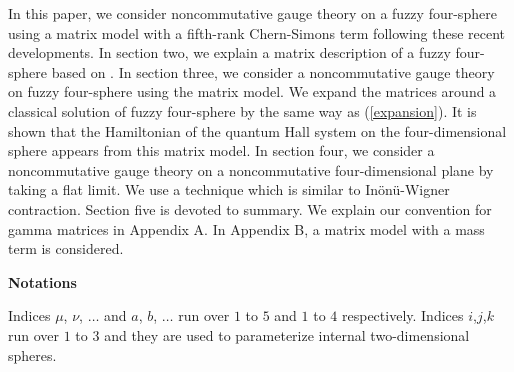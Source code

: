 \documentclass[a4paper,11pt]{article}
\begin{document}
In this paper, we consider noncommutative gauge theory on 
a fuzzy four-sphere using a matrix model 
with a fifth-rank Chern-Simons term 
following these recent developments. 
In section two, we explain a matrix description of 
a fuzzy four-sphere based on \cite{castelino}. 
In section three, we consider a noncommutative 
gauge theory on fuzzy four-sphere using the matrix model. 
We expand the matrices around a classical solution of fuzzy four-sphere 
by the same way as (\ref{expansion}). 
It is shown that the Hamiltonian of the quantum Hall system 
on the four-dimensional sphere appears from this 
matrix model. 
In section four, we consider a noncommutative gauge theory 
on a noncommutative four-dimensional plane by taking a flat limit. 
We use a technique which is similar to 
In\"{o}n\"{u}-Wigner contraction. 
Section five is devoted to summary. 
We explain our convention for gamma matrices in Appendix A. 
In Appendix B, a matrix model with a mass term is 
considered. 

\vspace{0.4cm}
\noindent 
{\bf Notations} 

Indices $\mu$, $\nu$, $\ldots$ 
and $a$, $b$, $\ldots$ run over $1$ to $5$ 
and $1$ to $4$ respectively. 
Indices $i$,$j$,$k$ run over $1$ to $3$ and 
they are used to parameterize 
internal two-dimensional spheres. 

\end{document}
